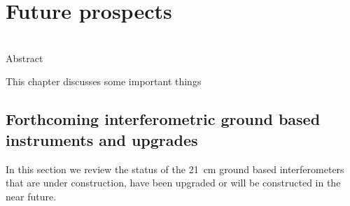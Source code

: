 \chapter{Future prospects}
\label{chapter:koopmans_bernardi}

\begin{bf}
  \author{Leon V. E. Koopmans (Kapteyn Astronomical Institute), Gianni Bernardi (INAF-IRA \& Rhodes University)}\\
  
Abstract\\
\end{bf}

This chapter discusses some important things




\section{Forthcoming interferometric ground based instruments and upgrades}

In this section we review the status of the 21~cm ground based interferometers that are under construction, have been upgraded or will be constructed in the near future.

